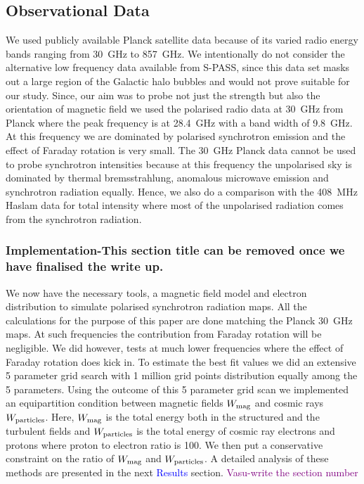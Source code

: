 \documentclass[12pt, a4 paper]{article}
\newcommand{\Vasu}[1]{{\color{purple}#1}}
\begin{document}

\subsection{Observational Data}
We used publicly available Planck satellite data because of its varied radio energy bands ranging from 30~GHz to 857~GHz. We intentionally do not consider the alternative low frequency data available from S-PASS, since this data set masks out a large region of the Galactic halo bubbles and would not prove suitable for our study. Since, our aim was to probe not just the strength but also the orientation of magnetic field we used the polarised radio data at 30~GHz from Planck where the peak frequency is at 28.4~GHz with a band width of 9.8~GHz. At this frequency we are dominated by polarised synchrotron emission and the effect of Faraday rotation is very small. %
The 30~GHz Planck data cannot be used to probe synchrotron intensities because at this frequency the unpolarised sky is dominated by thermal bremsstrahlung, anomalous microwave emission and synchrotron radiation equally. Hence, we also do a comparison with the 408~MHz Haslam data for total intensity where most of the unpolarised radiation comes from the synchrotron radiation.

\subsubsection{Implementation-\Vasu{This section title can be removed once we have finalised the write up.}}

We now have the necessary tools, a magnetic field model and electron distribution to simulate polarised synchrotron radiation maps.
All the calculations for the purpose of this paper are done matching the Planck 30~GHz maps. At such frequencies the contribution from Faraday rotation will be negligible. We did however, tests at much lower frequencies where the effect of Faraday rotation does kick in.  To estimate the best fit values we did an extensive 5 parameter grid search with 1 million grid points distribution equally among the 5 parameters. Using the outcome of this 5 parameter grid scan we implemented an equipartition condition between magnetic fields $W_{\rm mag}$ and cosmic rays $W_{\rm particles}$.
Here, $W_{\rm mag}$ is the total energy both in the structured and the turbulent fields and $W_{\rm particles}$ is the total energy of cosmic ray electrons and protons where proton to electron ratio is 100. We then put a conservative constraint on the ratio of $W_{\rm mag}$ and $W_{\rm particles}$. A detailed analysis of these methods are presented in the next \textcolor{blue}{Results} section.
\textcolor{purple}{Vasu-write the section number}
\end{document}
